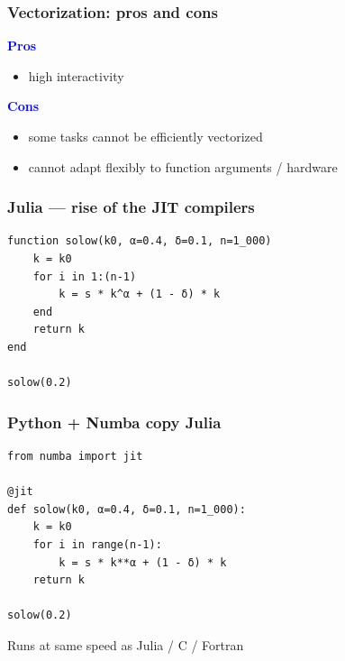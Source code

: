 \documentclass[
    xcolor={svgnames,dvipsnames},
    hyperref={colorlinks, citecolor=DeepPink4, linkcolor=DarkRed, urlcolor=DarkBlue}
    ]{beamer}  %
\newcommand{\navy}[1]{\textcolor{Blue}{\bf #1}}
\newcommand{\1}{\mathbbm 1}
\begin{document}
\begin{frame}
    \frametitle{Vectorization: pros and cons}

    \navy{Pros}

    \begin{itemize}
        \item high interactivity 
    \end{itemize}

    \vspace{0.5em}
    \vspace{0.5em}

    \navy{Cons}

    \begin{itemize}
        \item some tasks cannot be efficiently vectorized
        \vspace{0.2em}
        \item cannot adapt flexibly to function arguments /
            hardware
    \end{itemize}


\end{frame}




\begin{frame}[fragile]
    \frametitle{Julia --- rise of the JIT compilers}
    
    \begin{verbatim}
function solow(k0, α=0.4, δ=0.1, n=1_000)
    k = k0
    for i in 1:(n-1)
        k = s * k^α + (1 - δ) * k
    end
    return k
end

solow(0.2)
    \end{verbatim}

\end{frame}

\begin{frame}[fragile]
    \frametitle{Python + Numba copy Julia}
    
    \begin{verbatim}
from numba import jit

@jit
def solow(k0, α=0.4, δ=0.1, n=1_000):
    k = k0
    for i in range(n-1):
        k = s * k**α + (1 - δ) * k
    return k

solow(0.2)
    \end{verbatim}


    Runs at same speed as Julia / C / Fortran

\end{frame}
\end{document}
